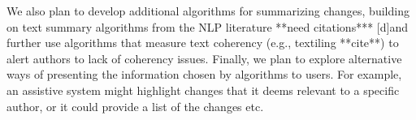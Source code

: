We also plan to develop additional algorithms for summarizing changes,
building on text summary algorithms from the NLP literature **need
citations*** {[}d{]}and further use algorithms that measure text
coherency (e.g., textiling **cite**) to alert authors to lack of
coherency issues. Finally, we plan to explore alternative ways of
presenting the information chosen by algorithms to users. For example,
an assistive system might highlight changes that it deems relevant to a
specific author, or it could provide a list of the changes etc.

